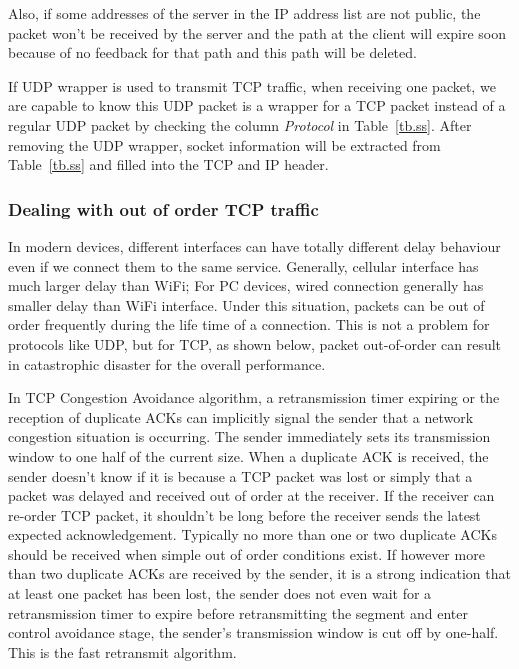 Also, if some addresses of the server in the IP address list are not public, the packet won't be received by the server and the path at the client will expire soon because of no feedback for that path and this path will be deleted. 

If UDP wrapper is used to transmit TCP traffic, when receiving one packet, we are capable to know this UDP packet is a wrapper for a TCP packet instead of a regular UDP packet by checking the column \emph{Protocol} in Table~\ref{tb.ss}. After removing the UDP wrapper, socket information will be extracted from Table~\ref{tb.ss} and filled into the TCP and IP header.


\subsubsection{Dealing with out of order TCP traffic}

In modern devices, different interfaces can have totally different delay behaviour even if we connect them to the same service. Generally, cellular interface has much larger delay than WiFi; For PC devices, wired connection generally has smaller delay than WiFi interface. Under this situation, packets can be out of order frequently during the life time of a connection. This is not a problem for protocols like UDP, but for TCP, as shown below, packet out-of-order can result in catastrophic disaster for the overall performance.

In TCP Congestion Avoidance algorithm, a retransmission timer expiring or the reception of duplicate ACKs can implicitly signal the sender that a network congestion situation is occurring. The sender immediately sets its transmission window to one half of the current size. When a duplicate ACK is received, the sender doesn't know if it is because a TCP packet was lost or simply that a packet was delayed and received out of order at the receiver. If the receiver can re-order TCP packet, it shouldn't be long before the receiver sends the latest expected acknowledgement. Typically no more than one or two duplicate ACKs should be received when simple out of order conditions exist. If however more than two duplicate ACKs are received by the sender, it is a strong indication that at least one packet has been lost, the sender does not even wait for a retransmission timer to expire before retransmitting the segment and enter control avoidance stage, the sender's transmission window is cut off by one-half. This is the fast retransmit algorithm.


